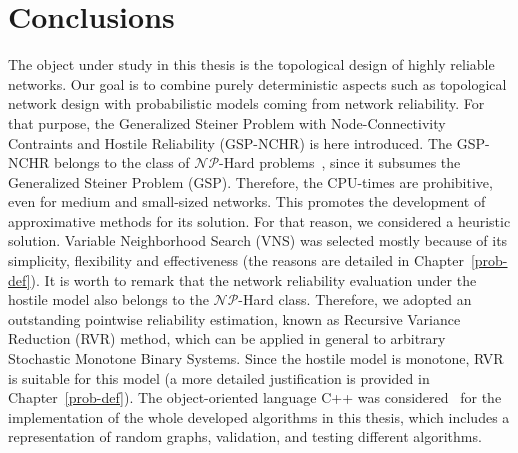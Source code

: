 \chapter{Conclusions}\label{conclusions}
The object under study in this thesis is the topological design of highly reliable networks. Our goal is to combine purely deterministic aspects such as topological network design with probabilistic models coming 
from network reliability. For that purpose, the Generalized Steiner Problem with Node-Connectivity Contraints and Hostile Reliability (GSP-NCHR) is here introduced. The GSP-NCHR belongs to the class of $\mathcal{NP}$-Hard problems~\cite{9}, since it subsumes the Generalized Steiner Problem (GSP). Therefore, the CPU-times are prohibitive, even for medium and small-sized networks. This promotes the development of approximative methods for its solution. For that reason, we considered a heuristic solution. Variable Neighborhood Search (VNS) was selected mostly because of its simplicity, flexibility and effectiveness (the reasons are detailed in Chapter~\ref{prob-def}). It is worth to remark that the network reliability evaluation under the hostile model also belongs to the 
$\mathcal{NP}$-Hard class. Therefore, we adopted an outstanding pointwise reliability estimation, 
known as Recursive Variance Reduction (RVR) method, which can be applied in general to arbitrary Stochastic Monotone Binary Systems. Since the hostile model is monotone, RVR is suitable for this model 
(a more detailed justification is provided in Chapter~\ref{prob-def}). The object-oriented language C++ 
was considered~\cite{13}  for the implementation of the whole developed algorithms in this thesis, which includes a representation of random graphs, validation, and testing different algorithms. 

